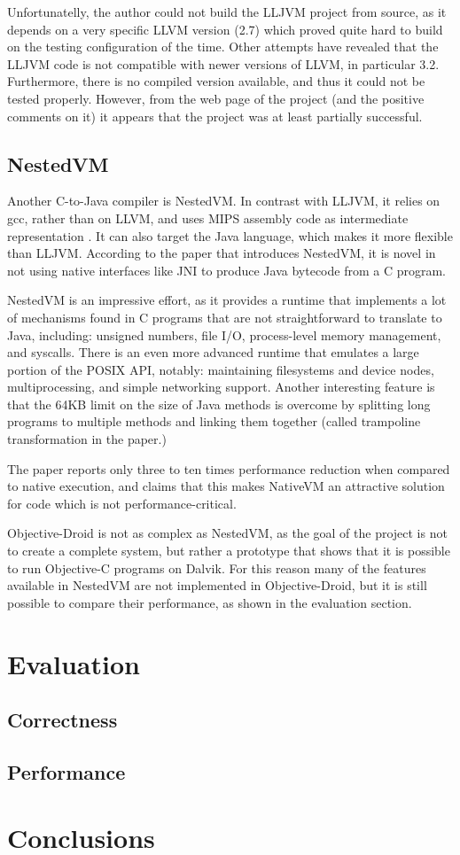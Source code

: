 \documentclass[parskip]{cs4rep}
\begin{document}
Unfortunatelly, the author could not build the LLJVM project from source, as it depends on a very specific LLVM version (2.7) which proved quite hard to build on the testing configuration of the time. Other attempts have revealed that the LLJVM code is not compatible with newer versions of LLVM, in particular 3.2. Furthermore, there is no compiled version available, and thus it could not be tested properly. However, from the web page of the project (and the positive comments on it) it appears that the project was at least partially successful.

\section{NestedVM}

Another C-to-Java compiler is NestedVM. In contrast with LLJVM, it relies on gcc, rather than on LLVM, and uses MIPS assembly code as intermediate representation \cite{AllietMegacz:ivme:2004}. It can also target the Java language, which makes it more flexible than LLJVM. According to the paper that introduces NestedVM, it is novel in not using native interfaces like JNI to produce Java bytecode from a C program.

NestedVM is an impressive effort, as it provides a runtime that implements a lot of mechanisms found in C programs that are not straightforward to translate to Java, including: unsigned numbers, file I/O, process-level memory management, and syscalls. There is an even more advanced runtime that emulates a large portion of the POSIX API, notably: maintaining filesystems and device nodes, multiprocessing, and simple networking support. Another interesting feature is that the 64KB limit on the size of Java methods is overcome by splitting long programs to multiple methods and linking them together (called trampoline transformation in the paper.)

The paper reports only three to ten times performance reduction when compared to native execution, and claims that this makes NativeVM an attractive solution for code which is not performance-critical.

Objective-Droid is not as complex as NestedVM, as the goal of the project is not to create a complete system, but rather a prototype that shows that it is possible to run Objective-C programs on Dalvik. For this reason many of the features available in NestedVM are not implemented in Objective-Droid, but it is still possible to compare their performance, as shown in the evaluation section.

\chapter{Evaluation}

\section{Correctness}

\section{Performance}

\chapter{Conclusions}



\end{document}
